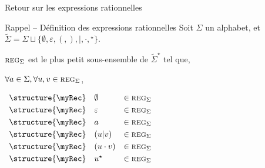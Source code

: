 
\begingroup

\begin{frame}{Retour sur les expressions rationnelles}
  \begin{block}{Rappel -- Définition des expressions rationnelles}
    Soit $\Sigma$ un alphabet, et $\tilde{\Sigma} = \Sigma \sqcup \{ \emptyset, \varepsilon, (, ), |, \cdot, {}^\star \}.$

    \alert{$\textsc{reg}_\Sigma$} est le plus petit sous-ensemble de $\tilde{\Sigma}^\star$ tel que, \\

    \vspace{5mm}
    \begin{minipage}{.5\textwidth}
      $\forall a\in \Sigma, \forall u, v \in \textsc{reg}_\Sigma$,

      \vspace{2mm}
      $\begin{array}{lll}
        \vspace{1mm}\structure{\myRec} & \emptyset     & \in \textsc{reg}_\Sigma\\
        \vspace{1mm}\structure{\myRec} & \varepsilon   & \in \textsc{reg}_\Sigma\\
        \vspace{1mm}\structure{\myRec} & a             & \in \textsc{reg}_\Sigma\\
        \vspace{1mm}\structure{\myRec} & ( u | v )     & \in \textsc{reg}_\Sigma\\
        \vspace{1mm}\structure{\myRec} & ( u \cdot v ) & \in \textsc{reg}_\Sigma\\
        \vspace{1mm}\structure{\myRec} & u^\star        & \in \textsc{reg}_\Sigma\\
      \end{array}$
    \end{minipage}%
    \begin{minipage}{.5\textwidth}
      

\end{minipage}
\end{block}
\end{frame}
